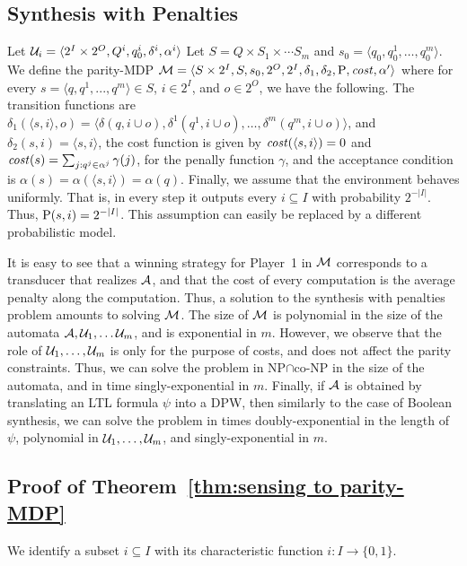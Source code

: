 \documentclass[runningheads,a4paper]{llncs}
\newcommand{\set}[1]{{\{#1\}}}
\newcommand{\zug}[1]{\langle #1  \rangle}
\newcommand{\A}{{\cal A}}
\newcommand{\M}{{\cal M}}
\newcommand{\U}{{\cal U}}
\newcommand{\tIN}{{2^I}}
\newcommand{\tOUT}{{2^O}}
\newcommand{\MDPProb}{{\rm P}}
\newcommand{\MDPcost}{{\it cost}}
\begin{document}
\subsection{Synthesis with Penalties}
\label{app penalties}

Let $\U_i=\zug{\tIN\times\tOUT,Q^i,q^i_0,\delta^i,\alpha^i}$
Let $S=Q \times S_1 \times \cdots S_m$ and $s_0=\zug{q_0,q_0^1,\ldots,q_0^m}$. We define the parity-MDP $\M=\zug{S \times 2^I,S,s_0,2^O,2^I,\delta_1,\delta_2,\MDPProb,\MDPcost,\alpha'}$ where for every $s=\zug{q,q^1,...,q^m}\in S$, $i\in \tIN$, and $o\in \tOUT$, we have the following. The transition functions are $\delta_1(\zug{s,i},o)=\zug{\delta(q,i \cup o),\delta^1(q^1,i \cup o),\ldots,\delta^m(q^m,i \cup o)}$, and $\delta_2(s,i)=\zug{s,i}$, the cost function is given by $\MDPcost(\zug{s,i})=0$ and $\MDPcost(s)=\sum_{j:q^j\in \alpha^j}\gamma(j)$, for the penally function $\gamma$, and the acceptance condition is $\alpha(s)=\alpha(\zug{s,i})=\alpha(q)$. Finally, we assume that the environment behaves uniformly. That is, in every step it outputs every $i\subseteq I$ with probability $2^{-|I|}$. Thus, $\MDPProb(s,i)=2^{-|I|}$. This assumption can easily be replaced by a different probabilistic model. 

It is easy to see that a winning strategy for Player~1 in $\M$ corresponds to a transducer that realizes $\A$, and that the cost of every computation is the average penalty along the computation. Thus, a solution to the synthesis with penalties problem amounts to solving $\M$. The size of $\M$ is polynomial in the size of the automata $\A,\U_1,\ldots \U_m$, and is exponential in $m$. However, we observe that the role of $\U_1,\ldots, \U_m$ is only for the purpose of costs, and does not affect the parity constraints. Thus, we can solve the problem in NP$\cap$co-NP in the size of the automata, and in time singly-exponential in $m$.
Finally, if $\A$ is obtained by translating an LTL formula $\psi$ into a DPW, then similarly to the case of Boolean synthesis, we can solve the problem in times doubly-exponential in the length of $\psi$, polynomial in $\U_1,\ldots,\U_m$, and singly-exponential in $m$.

\subsection{Proof of Theorem~\ref{thm:sensing to parity-MDP}}
\label{app sen construction}

We identify a subset $i\subseteq I$ with its characteristic function $i:I\to \set{0,1}$. 
\end{document}
